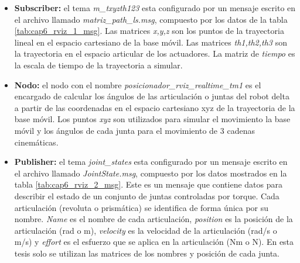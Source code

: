     \begin{itemize}
        \item {\textbf{Subscriber:} el tema \textit{m\_txyzth123} esta configurado por un mensaje escrito en el archivo llamado \textit{matriz\_path\_ls.msg}, compuesto por los datos de la tabla \ref{tab:cap6_rviz_1_msg}. Las matrices \textit{x,y,z} son los puntos de la trayectoria lineal  en el espacio cartesiano de la base móvil. Las matrices \textit{th1,th2,th3} son la trayectoria en el espacio articular de los actuadores. La matriz de \textit{tiempo} es la escala de tiempo de la trayectoria a simular.}
        \item {\textbf{Nodo:} el nodo con el nombre \textit{posicionador\_rviz\_realtime\_tm1} es el encargado de calcular los ángulos de las articulación o juntas del robot delta a partir de las coordenadas en el espacio cartesiano xyz  de la trayectoria de la base móvil. Los puntos \textit{xyz} son utilizados para simular el movimiento la base móvil y los ángulos de cada junta para el movimiento de 3 cadenas cinemáticas.}
        \item {\textbf{Publisher:}  el tema \textit{joint\_states} esta configurado por un mensaje escrito en el archivo llamado \textit{JointState.msg}, compuesto por los datos mostrados en la tabla \ref{tab:cap6_rviz_2_msg}. Este es un mensaje que contiene datos para describir el estado de un conjunto de juntas controladas por torque. Cada articulación (revoluta o prismática) se identifica de forma única por su nombre. \textit{Name} es el nombre de cada articulación, \textit{position} es la posición de la articulación (rad o m), \textit{velocity} es la velocidad de la articulación (rad/s o m/s) y \textit{effort} es el esfuerzo que se aplica en la articulación (Nm o N). En esta tesis solo se utilizan las matrices de los nombres y posición de cada junta.}
    \end{itemize} 
    
